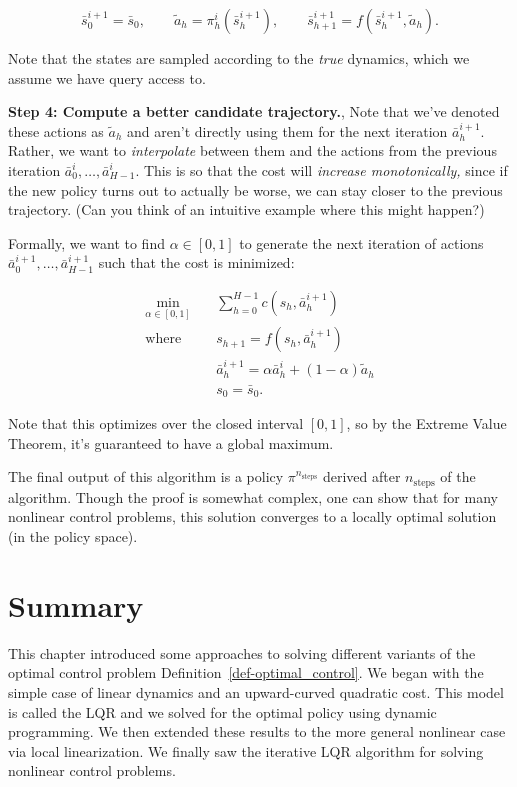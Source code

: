 \documentclass[
  letterpaper,
  DIV=11,
  numbers=noendperiod]{scrreprt}
\theoremstyle{plain}
\theoremstyle{plain}
\theoremstyle{definition}
\theoremstyle{definition}
\theoremstyle{remark}
\begin{document}
\[
\bar s^{i+1}_0 = \bar s_0, \qquad \widetilde a_h= \pi^i_h(\bar s^{i+1}_h), \qquad \bar s^{i+1}_{h+1} = f(\bar s^{i+1}_h, \widetilde a_h).
\]

Note that the states are sampled according to the \emph{true} dynamics,
which we assume we have query access to.

\textbf{Step 4: Compute a better candidate trajectory.}, Note that we've
denoted these actions as \(\widetilde a_h\) and aren't directly using
them for the next iteration \(\bar a^{i+1}_h\). Rather, we want to
\emph{interpolate} between them and the actions from the previous
iteration \(\bar a^i_0, \dots, \bar a^i_{H-1}\). This is so that the
cost will \emph{increase monotonically,} since if the new policy turns
out to actually be worse, we can stay closer to the previous trajectory.
(Can you think of an intuitive example where this might happen?)

Formally, we want to find \(\alpha \in [0, 1]\) to generate the next
iteration of actions \(\bar a^{i+1}_0, \dots, \bar a^{i+1}_{H-1}\) such
that the cost is minimized:

\[
\begin{aligned}
    \min_{\alpha \in [0, 1]} \quad & \sum_{h=0}^{H-1} c(s_h, \bar a^{i+1}_h)                     \\
    \text{where} \quad             & s_{h+1} = f(s_h, \bar a^{i+1}_h)                             \\
                                   & \bar a^{i+1}_h= \alpha \bar a^i_h+ (1-\alpha) \widetilde a_h\\
                                   & s_0 = \bar s_0.
\end{aligned}
\]

Note that this optimizes over the closed interval \([0, 1]\), so by the
Extreme Value Theorem, it's guaranteed to have a global maximum.

The final output of this algorithm is a policy \(\pi^{n_\text{steps}}\)
derived after \(n_\text{steps}\) of the algorithm. Though the proof is
somewhat complex, one can show that for many nonlinear control problems,
this solution converges to a locally optimal solution (in the policy
space).

\section{Summary}\label{summary-1}

This chapter introduced some approaches to solving different variants of
the optimal control problem Definition~\ref{def-optimal_control}. We
began with the simple case of linear dynamics and an upward-curved
quadratic cost. This model is called the LQR and we solved for the
optimal policy using dynamic programming. We then extended these results
to the more general nonlinear case via local linearization. We finally
saw the iterative LQR algorithm for solving nonlinear control problems.
\end{document}
